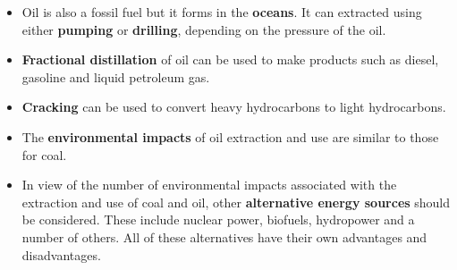 \begin{itemize}
\item{Oil is also a fossil fuel but it forms in the \textbf{oceans}. It can extracted using either \textbf{pumping} or \textbf{drilling}, depending on the pressure of the oil.}
\item{\textbf{Fractional distillation} of oil can be used to make products such as diesel, gasoline and liquid petroleum gas.}
\item{\textbf{Cracking} can be used to convert heavy hydrocarbons to light hydrocarbons.}
\item{The \textbf{environmental impacts} of oil extraction and use are similar to those for coal.}
\item{In view of the number of environmental impacts associated with the extraction and use of coal and oil, other \textbf{alternative energy sources} should be considered. These include nuclear power, biofuels, hydropower and a number of others. All of these alternatives have their own advantages and disadvantages.}
\end{itemize}

